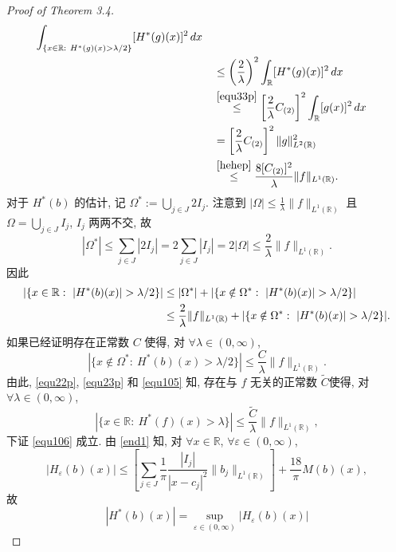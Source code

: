 \documentclass[a4paper,11pt]{article}
\theoremstyle{definition}
\begin{document}
\begin{CJK*}{UTF8}{gbsn}
\begin{proof}[Proof of Theorem 3.4]
\begin{align}
                \int_{\{x\in\mathbb{R} :\ H^* (g)(x) > \lambda/2 \}} [H^* (g)(x)]^2\,dx \notag \\
              	&\quad\leq \left( \frac{2}{\lambda} \right)^2
                \int_{\mathbb{R}} [H^* (g)(x)]^2 \, dx \notag \\
              	&\quad\overset{\eqref{equ33p}}{\leq} \left[ \frac{2}{\lambda} C_{(2)} \right]^2  \int_{\mathbb{R}} [g(x)]^2 \, dx \notag \\
              	&\quad= \left[ \frac{2}{\lambda} C_{(2)} \right]^2  \| g \|_{L^2(\mathbb{R})}^2 \notag \\
            &\quad\overset{\eqref{hehep}}{\leq} \frac{8 [C_{(2)}]^2}{\lambda} \| f \|_{L^1(\mathbb{R})}. \notag
    \end{align}
    对于 $ H^* (b) $ 的估计, 记 $\Omega^*:=\bigcup_{j \in J}2I_j$.
    注意到 $|\Omega|\leq \frac{1}{\lambda}\|f\|_{L^1(\mathbb{R})}$ 且 $\Omega=\bigcup_{j \in J}I_j$, $I_j$ 两两不交, 故
    $$|\Omega^*|\leq \sum_{j \in J}|2I_j|= 2\sum_{j \in J}|I_j|= 2|\Omega|\leq \frac{2}{\lambda}\|f\|_{L^1(\mathbb{R})}.$$
    因此 
    \begin{align} \label{equ105}
        |\{ x \in \mathbb{R} :\ |H^* (b) (x)| > \lambda/2 \}| 
            &\leq |\Omega^*| + |\{ x \notin \Omega^* :\ |H^* (b) (x)| > \lambda/2 \}|  \\
            &\leq \frac{2}{\lambda} \|f\|_{L^1(\mathbb{R})} 
                + |\{ x \notin \Omega^* :\ |H^* (b) (x)| > \lambda/2 \}|. \notag
    \end{align}
    如果已经证明存在正常数 $ C $ 使得, 对 $ \forall \lambda \in (0, \infty) $,
    \begin{equation} \label{equ106}
        |\{x \notin \Omega^*:\ H^* (b)(x) > \lambda / 2 \}|
            \leq \frac{C}{\lambda} \|f\|_{L^1(\mathbb{R})}.
    \end{equation}
    由此, \eqref{equ22p}, \eqref{equ23p} 和 \eqref{equ105} 知, 
    存在与 $ f $ 无关的正常数 $ \widetilde{C} $使得, 对 $ \forall \lambda \in (0, \infty) $,
    $$
        |\{x \in \mathbb{R}:\ H^* (f)(x) > \lambda \}|
            \leq \frac{\widetilde{C}}{\lambda} \|f\|_{L^1(\mathbb{R})},
    $$
    下证 \eqref{equ106} 成立.
    由 \eqref{end1} 知, 对 $ \forall x \in \mathbb{R} $, $ \forall \varepsilon \in (0, \infty) $,
    $$
        |H_\varepsilon (b) (x)| 
            \leq \left[ \sum_{j \in J} \frac{1}{\pi} \frac{|I_j|}{|x - c_j|^2} \|b_j\|_{L^1(\mathbb{R})} \right]
                + \frac{18}{\pi} M (b)(x),
    $$
    故
    $$
        |H^* (b) (x)| = \sup_{\varepsilon \in (0, \infty)} |H_\varepsilon (b) (x)| 
$$
\end{proof}
\end{CJK*}
\end{document}
